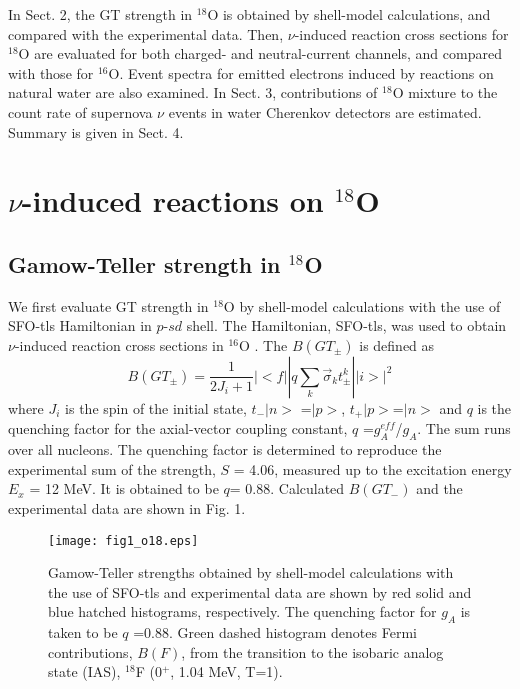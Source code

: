 \documentclass[preprint,12pt]{elsarticle}
\begin{document}
In Sect. 2, the GT strength in $^{18}$O is obtained by shell-model calculations, and compared with the experimental data.
Then, $\nu$-induced reaction cross sections for $^{18}$O are evaluated for both charged- and neutral-current channels, and
compared with those for $^{16}$O.
Event spectra for emitted electrons induced by reactions on natural water are also examined.
In Sect. 3, contributions of $^{18}$O mixture to the count rate of supernova $\nu$ events in water Cherenkov detectors are estimated. 
Summary is given in Sect. 4.
    

\section{$\nu$-induced reactions on $^{18}$O}
\label{sec2}
\subsection{Gamow-Teller strength in $^{18}$O}
We first evaluate GT strength in $^{18}$O by shell-model calculations with the use of SFO-tls Hamiltonian \cite{SFO} in $p$-$sd$ shell.
The Hamiltonian, SFO-tls, was used to obtain $\nu$-induced reaction cross sections in $^{16}$O \cite{SC2018}.
The $B(GT_{\pm})$ is defined as
\begin{equation}
B(GT_{\pm}) = \frac{1}{2J_i +1} |<f|| q \sum_{k} \vec{\sigma}_{k} t_{\pm}^{k} ||i>|^2
\end{equation}
where $J_i$ is the spin of the initial state, $t_{-}|n>$ =$|p>$, $t_{+}|p>$=$|n>$ and 
$q$ is the quenching factor for the axial-vector coupling constant, $q$ =$g_A^{eff}$/$g_A$.
The sum runs over all nucleons.  
The quenching factor is determined to reproduce the experimental sum of the strength, $S$ = 4.06, measured up to the excitation energy $E_x$ = 12 MeV.
It is obtained to be $q$= 0.88.
Calculated $B(GT_{-})$ and the experimental data \cite{ox18gt} are shown in Fig. 1.

\begin{figure}[htbp]
\vspace*{-0.5cm}
\begin{minipage}{0.45\hsize}
\begin{center}
\hspace*{1cm}
\texttt{[image: fig1\_o18.eps]}
\end{center}
\end{minipage}
\vspace*{-3.5cm}
\caption{\small 
Gamow-Teller strengths obtained by shell-model calculations with the use of SFO-tls and experimental data \cite{ox18gt} are shown by red solid and blue hatched histograms, respectively. The quenching factor for $g_A$ is taken to be $q$ =0.88.
Green dashed histogram denotes Fermi contributions, $B(F)$, from the transition to the isobaric analog state (IAS), $^{18}$F (0$^{+}$, 1.04 MeV, T=1).} 
\label{o18gt}
\end{figure}
\end{document}
